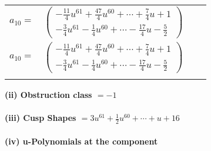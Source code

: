 \documentclass[1p]{elsarticle_modified}
\theoremstyle{definition}
\begin{document}
\begin{tabular}{m{7pt} m{180pt} m{7pt} m{180pt} }
\flushright $a_{10}=$&$\begin{pmatrix}-\frac{11}{4} u^{61}+\frac{47}{4} u^{60}+\cdots+\frac{7}{4} u+1\\-\frac{3}{4} u^{61}-\frac{1}{4} u^{60}+\cdots-\frac{17}{4} u-\frac{5}{2}\end{pmatrix}$\\ \flushright $a_{10}=$&$\begin{pmatrix}-\frac{11}{4} u^{61}+\frac{47}{4} u^{60}+\cdots+\frac{7}{4} u+1\\-\frac{3}{4} u^{61}-\frac{1}{4} u^{60}+\cdots-\frac{17}{4} u-\frac{5}{2}\end{pmatrix}$\\&\end{tabular}
\flushleft \textbf{(ii) Obstruction class $= -1$}\\~\\
\flushleft \textbf{(iii) Cusp Shapes $= 3 u^{61}+\frac{1}{2} u^{60}+\cdots+u+16$}\\~\\
\newpage\renewcommand{\arraystretch}{1}
\flushleft \textbf{(iv) u-Polynomials at the component}\newline \\
\end{document}
